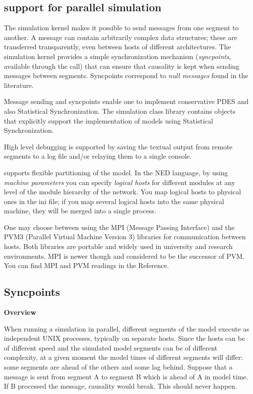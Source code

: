 \subsection{{\opp} support for parallel simulation}

The simulation kernel makes it possible to send messages from one
segment to another. A message can contain arbitrarily complex data
structures; these are transferred transparently, even between hosts of
different architectures. The simulation kernel provides a simple
synchronization mechanism (\textit{syncpoints}, available through the
 call) that can ensure that causality is kept when
sending messages between segments. Syncpoints correspond to
\textit{null messages} found in the literature.

Message sending and syncpoints enable one to implement conservative 
PDES and also Statistical Synchronization. The simulation class 
library contains objects that explicitly support the implementation 
of models using Statistical Synchronization.


High level debugging is supported by saving the textual output 
from remote segments to a log file and/or relaying them to a 
single console.

{\opp} supports flexible partitioning of the
model. In the NED language, by using
\textit{machine parameters} you can specify \textit{logical
  hosts} for different modules at any level of
the module hierarchy of the network. You map logical hosts to physical
ones in the ini file; if you map several logical hosts into the same
physical machine, they will be merged into a single {\opp} process.


One may choose between using the MPI (Message Passing
Interface) and the PVM3 (Parallel Virtual Machine Version
3) libraries for communication between hosts. Both libraries are
portable and widely used in university and research environments. MPI
is newer though and considered to be the successor of PVM. You can
find MPI and PVM readings in the Reference.





\subsection{Syncpoints}

\textbf{Overview}


When running a simulation in parallel, different segments of 
the model execute as independent UNIX processes, typically on 
separate hosts. Since the hosts can be of different speed and 
the simulated model segments can be of different complexity, 
at a given moment the model times of different segments will 
differ: some segments are ahead of the others and some lag behind. 
Suppose that a message is sent from segment A to segment B which 
is ahead of A in model time. If B processed the message, causality 
would break. This should never happen.


